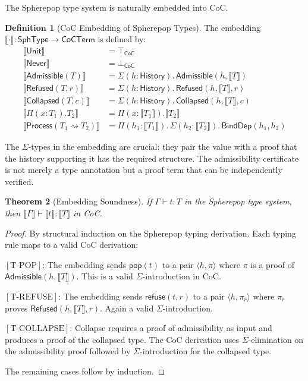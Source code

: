 \documentclass[12pt, a4paper, openany]{book}
\theoremstyle{plain}
\newtheorem{theorem}{Theorem}[chapter]
\theoremstyle{definition}
\newtheorem{definition}[theorem]{Definition}
\theoremstyle{remark}
\newcommand{\Adm}{\mathsf{Admissible}}
\newcommand{\Rfsd}{\mathsf{Refused}}
\newcommand{\Col}{\mathsf{Collapsed}}
\newcommand{\Proc}{\mathsf{Process}}
\begin{document}
The Spherepop type system is naturally embedded into CoC.

\begin{definition}[CoC Embedding of Spherepop Types]
The embedding $\llbracket \cdot \rrbracket : \mathsf{SphType} \to \mathsf{CoCTerm}$
is defined by:
\begin{align*}
\llbracket \mathsf{Unit} \rrbracket &= \top_{\mathsf{CoC}} \\
\llbracket \mathsf{Never} \rrbracket &= \bot_{\mathsf{CoC}} \\
\llbracket \Adm(T) \rrbracket &= \Sigma(h : \mathsf{History}).\, \mathsf{Admissible}(h, \llbracket T \rrbracket) \\
\llbracket \Rfsd(T, r) \rrbracket &= \Sigma(h : \mathsf{History}).\, \mathsf{Refused}(h, \llbracket T \rrbracket, r) \\
\llbracket \Col(T, c) \rrbracket &= \Sigma(h : \mathsf{History}).\, \mathsf{Collapsed}(h, \llbracket T \rrbracket, c) \\
\llbracket \Pi(x : T_1).T_2 \rrbracket &= \Pi(x : \llbracket T_1 \rrbracket).\llbracket T_2 \rrbracket \\
\llbracket \Proc(T_1 \rightsquigarrow T_2) \rrbracket &=
  \Pi(h_1 : \llbracket T_1 \rrbracket).\, \Sigma(h_2 : \llbracket T_2 \rrbracket).\,
  \mathsf{BindDep}(h_1, h_2)
\end{align*}
\end{definition}

The $\Sigma$-types in the embedding are crucial: they pair the value with a
proof that the history supporting it has the required structure. The admissibility
certificate is not merely a type annotation but a proof term that can be
independently verified.

\begin{theorem}[Embedding Soundness]
If $\Gamma \vdash t : T$ in the Spherepop type system, then
$\llbracket \Gamma \rrbracket \vdash \llbracket t \rrbracket : \llbracket T \rrbracket$
in CoC.
\end{theorem}

\begin{proof}
By structural induction on the Spherepop typing derivation. Each typing rule maps
to a valid CoC derivation:

$[\mathrm{T\text{-}POP}]$: The embedding sends $\mathsf{pop}(t)$ to a pair
$\langle h, \pi \rangle$ where $\pi$ is a proof of $\mathsf{Admissible}(h, \llbracket T \rrbracket)$.
This is a valid $\Sigma$-introduction in CoC.

$[\mathrm{T\text{-}REFUSE}]$: The embedding sends $\mathsf{refuse}(t, r)$ to a
pair $\langle h, \pi_r \rangle$ where $\pi_r$ proves $\mathsf{Refused}(h, \llbracket T \rrbracket, r)$.
Again a valid $\Sigma$-introduction.

$[\mathrm{T\text{-}COLLAPSE}]$: Collapse requires a proof of admissibility as
input and produces a proof of the collapsed type. The CoC derivation uses
$\Sigma$-elimination on the admissibility proof followed by $\Sigma$-introduction
for the collapsed type.

The remaining cases follow by induction.
\end{proof}
\end{document}
